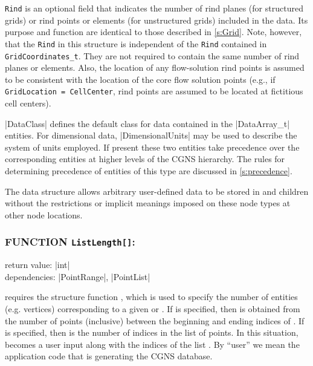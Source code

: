 \texttt{Rind} is an optional field that indicates
the number of rind planes (for structured grids) or rind points or
elements (for unstructured grids) included in the data.
Its purpose and function are identical to those described in
\autoref{s:Grid}.
Note, however, that the \texttt{Rind} in this structure is independent
of the \texttt{Rind} contained in \texttt{GridCoordinates\_t}.
They are not required to contain the same number of rind planes or
elements.
Also, the location of any flow-solution rind points is assumed to be
consistent with the location of the core flow solution points (e.g.,
if \texttt{GridLocation = CellCenter}, rind points are assumed to be
located at fictitious cell centers).

|DataClass| defines the default class for data contained in the
|DataArray_t| entities.
For dimensional data, |DimensionalUnits| may be used to describe the
system of units employed.
If present these two entities take precedence over the corresponding
entities at higher levels of the CGNS hierarchy.
The rules for determining precedence of entities of this type are
discussed in \autoref{s:precedence}.

The  data structure allows arbitrary
user-defined data to be stored in  and
 children without the restrictions or implicit
meanings imposed on these node types at other node locations.

\subsubsection*{FUNCTION \texttt{ListLength[]}:}

\noindent return value: |int| \\
\noindent dependencies: |PointRange|, |PointList|

 requires the structure function , which
is used to specify the number of entities (e.g. vertices) corresponding to a
given  or . If
 is specified, then  is obtained from
the number of points (inclusive) between the beginning and ending indices of
. If  is specified, then
 is the number of indices in the list of points. In this
situation,  becomes a user input along with the indices of the
list . By ``user'' we mean the application code that is
generating the CGNS database.

